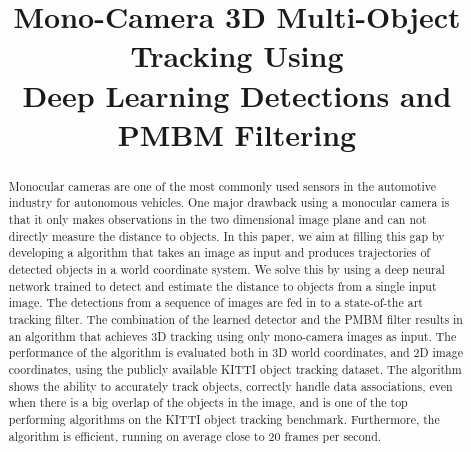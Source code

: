 \documentclass[conference]{IEEEtran}
\begin{document}
\title{Mono-Camera 3D Multi-Object Tracking Using \\ Deep Learning Detections and PMBM Filtering}

\author{
}



 














\maketitle

\begin{abstract}
Monocular cameras are one of the most commonly used sensors in the automotive industry for autonomous vehicles.
One major drawback using a monocular camera is that it only makes observations in the two dimensional image plane and can not directly measure the distance to objects. In this paper, we aim at filling this gap by developing a  algorithm that takes an image as input and produces trajectories of detected objects in a world coordinate system.
We solve this by using a deep neural network trained to detect and estimate the distance to objects from a single input image.
The detections from a sequence of images are fed in to a state-of-the art  tracking filter. The combination of the learned detector and the PMBM filter results in an algorithm that achieves 3D tracking using only mono-camera images as input.
The performance of the algorithm is evaluated both in 3D world coordinates, and 2D image coordinates, using the publicly available KITTI object tracking dataset.
The algorithm shows the ability to accurately track objects, correctly handle data associations, even when there is a big overlap of the objects in the image, and is one of the top performing algorithms on the KITTI object tracking benchmark. Furthermore, the algorithm is efficient, running on average close to 20 frames per second.

 \end{abstract}
\end{document}
